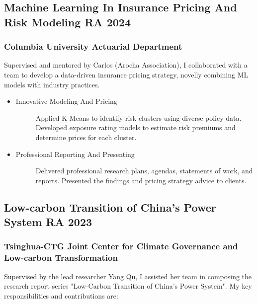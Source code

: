 \documentclass[a4paper]{article}
\begin{document}
\hypertarget{integrated-project}{
    \subsection{Machine Learning In Insurance Pricing And Risk Modeling \normalfont \hfill RA \hfill 2024}}
\subsubsection{Columbia University Actuarial Department} 
\vspace{3pt}
Supervised and mentored by Carlos (Arocha Association), I collaborated with a team to develop a data-driven insurance pricing strategy, novelly combining ML models with industry practices.
\begin{itemize}
    \item\begin{description}
        \item[Innovative Modeling And Pricing] Applied K-Means to identify risk clusters using diverse policy data. Developed exposure rating models to estimate risk premiums and determine prices for each cluster. 
    \end{description}
    \item\begin{description}
        \item[Professional Reporting And Presenting] Delivered professional research plans, agendas, statements of work, and reports. Presented the findings and pricing strategy advice to clients. 
    \end{description}
\end{itemize} 

\subsection{Low-carbon Transition of China's Power System \normalfont \hfill RA \hfill 2023} 
\subsubsection{Tsinghua-CTG Joint Center for Climate Governance and Low-carbon Transformation} 
\vspace{3pt}
    Supervised by the lead researcher Yang Qu, I assisted her team in composing the research report series "Low-Carbon Transition of China’s Power System". My key responsibilities and contributions are:
\end{document}
